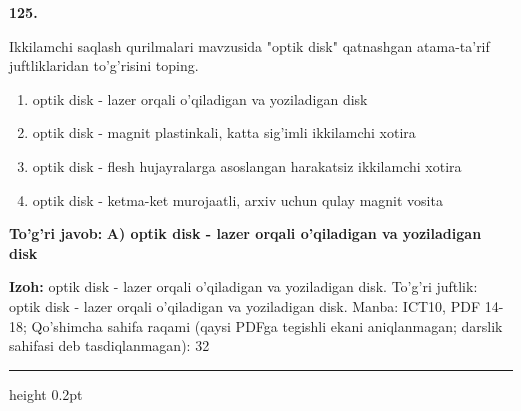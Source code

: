 \documentclass[10pt,a4paper]{article}
\begin{document}
{\bfseries\sffamily\color{ink} 125.}
\par
Ikkilamchi saqlash qurilmalari mavzusida "optik disk" qatnashgan atama-ta'rif juftliklaridan to'g'risini toping.
\begin{enumerate}[label=\Alph*),leftmargin=9mm]
\item optik disk - lazer orqali o'qiladigan va yoziladigan disk
\item optik disk - magnit plastinkali, katta sig'imli ikkilamchi xotira
\item optik disk - flesh hujayralarga asoslangan harakatsiz ikkilamchi xotira
\item optik disk - ketma-ket murojaatli, arxiv uchun qulay magnit vosita
\end{enumerate}
\begin{tcolorbox}[enhanced,breakable,colback=teal!4,colframe=teal!60!black,boxrule=0.45pt,arc=1.2mm,left=2.7mm,right=2.7mm,top=1.8mm,bottom=1.8mm,before skip=2mm,after skip=2mm]
{\bfseries\sffamily\color{teal}To'g'ri javob:} \textbf{A) optik disk - lazer orqali o'qiladigan va yoziladigan disk}
\par\smallskip
{\bfseries Izoh:} optik disk - lazer orqali o'qiladigan va yoziladigan disk. To'g'ri juftlik: optik disk - lazer orqali o'qiladigan va yoziladigan disk. Manba: ICT10, PDF 14-18; Qo'shimcha sahifa raqami (qaysi PDFga tegishli ekani aniqlanmagan; darslik sahifasi deb tasdiqlanmagan): 32
\end{tcolorbox}
\vspace{2mm}\hrule height 0.2pt\vspace{3mm}
\end{document}
